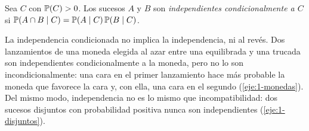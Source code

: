 \begin{definicion}
Sea $C$ con $\mathbb{P}(C)>0$. Los sucesos $A$ y $B$ son \emph{independientes condicionalmente a $C$} si $\mathbb{P}(A\cap B\mid C)=\mathbb{P}(A\mid C)\,\mathbb{P}(B\mid C)$.
\end{definicion}

\begin{observacion}
La independencia condicionada no implica la independencia, ni al revés. Dos lanzamientos de una moneda elegida al azar entre una equilibrada y una trucada son independientes condicionalmente a la moneda, pero no lo son incondicionalmente: una cara en el primer lanzamiento hace más probable la moneda que favorece la cara y, con ella, una cara en el segundo (\cref{eje:1-monedas}). Del mismo modo, independencia no es lo mismo que incompatibilidad: dos sucesos disjuntos con probabilidad positiva nunca son independientes (\cref{eje:1-disjuntos}).
\end{observacion}

\addtocounter{definicion}{1}%

